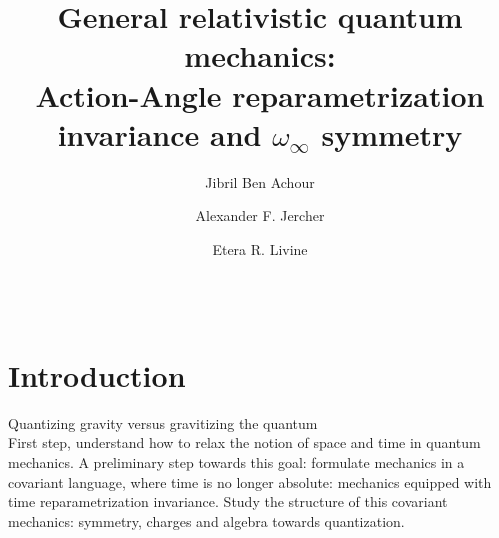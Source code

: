 \documentclass[onecolumn,notitlepage,superscriptaddress, nofootinbib,nobibnotes, aps,prd,10pt]{revtex4-1}%
\begin{document}
\title{General relativistic quantum mechanics: \\  \smallskip Action-Angle reparametrization invariance and $\omega_{\infty}$ symmetry}  

\author{Jibril Ben Achour}
\author{Alexander F. Jercher}
\author{Etera R. Livine}



 
\begin{abstract}\vspace{-1pt}
\begin{center}\textbf{\abstractname}\end{center}\vspace{-3pt} 
%



\vspace*{-8pt}
$\,$

%
\end{abstract}

\maketitle  

\makeatletter
\makeatother
\tableofcontents

\section{Introduction}

Quantizing gravity versus gravitizing the quantum\\
First step, understand how to relax the notion of space and time in quantum mechanics.
A preliminary step towards this goal: formulate mechanics in a covariant language, where time is no longer absolute: mechanics equipped with time reparametrization invariance.
Study the structure of this covariant mechanics: symmetry, charges and algebra towards quantization.
\end{document}

